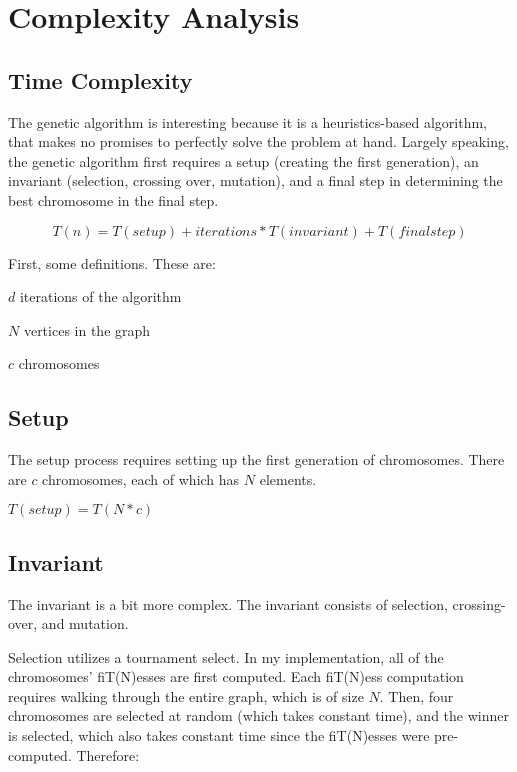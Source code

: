 \section{Complexity Analysis}

\subsection{Time Complexity}

The genetic algorithm is interesting because it is a heuristics-based algorithm, that makes no promises to perfectly solve the problem at hand. Largely speaking, the genetic algorithm first requires a setup (creating the first generation), an invariant (selection, crossing over, mutation), and a final step in determining the best chromosome in the final step.

\begin{equation}
T(n) = T(setup) + iterations * T(invariant) + T(final step)
\end{equation}

First, some definitions. These are:

\begin{center}
$d$ iterations of the algorithm

$N$ vertices in the graph

$c$ chromosomes  
\end{center} 

\subsection{Setup}

The setup process requires setting up the first generation of chromosomes. There are $c$ chromosomes, each of which has $N$ elements. 

$T(setup) = T(N * c)$

\subsection{Invariant}

The invariant is a bit more complex. The invariant consists of selection, crossing-over, and mutation.

Selection utilizes a tournament select. In my implementation, all of the chromosomes' fiT(N)esses are first computed. Each fiT(N)ess computation requires walking through the entire graph, which is of size $N$. Then, four chromosomes are selected at random (which takes constant time), and the winner is selected, which also takes constant time since the fiT(N)esses were pre-computed. Therefore:

